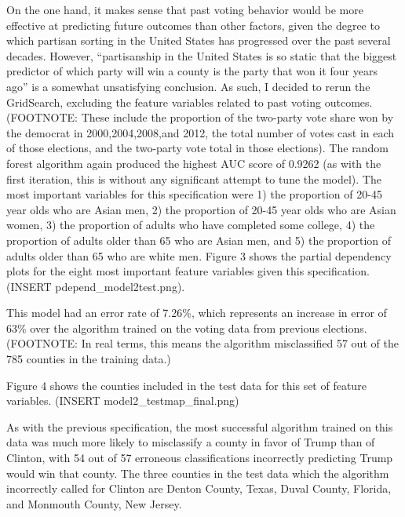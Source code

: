 \documentclass[11pt]{article}
\begin{document}
    On the one hand, it makes sense that past voting behavior would be more
effective at predicting future outcomes than other factors, given the
degree to which partisan sorting in the United States has progressed
over the past several decades. However, ``partisanship in the United
States is so static that the biggest predictor of which party will win a
county is the party that won it four years ago'' is a somewhat
unsatisfying conclusion. As such, I decided to rerun the GridSearch,
excluding the feature variables related to past voting outcomes.
(FOOTNOTE: These include the proportion of the two-party vote share won
by the democrat in 2000,2004,2008,and 2012, the total number of votes
cast in each of those elections, and the two-party vote total in those
elections). The random forest algorithm again produced the highest AUC
score of 0.9262 (as with the first iteration, this is without any
significant attempt to tune the model). The most important variables for
this specification were 1) the proportion of 20-45 year olds who are
Asian men, 2) the proportion of 20-45 year olds who are Asian women, 3)
the proportion of adults who have completed some college, 4) the
proportion of adults older than 65 who are Asian men, and 5) the
proportion of adults older than 65 who are white men. Figure 3 shows the
partial dependency plots for the eight most important feature variables
given this specification. (INSERT pdepend\_model2test.png).

This model had an error rate of 7.26\%, which represents an increase in
error of 63\% over the algorithm trained on the voting data from
previous elections. (FOOTNOTE: In real terms, this means the algorithm
misclassified 57 out of the 785 counties in the training data.)

Figure 4 shows the counties included in the test data for this set of
feature variables. (INSERT model2\_testmap\_final.png)

As with the previous specification, the most successful algorithm
trained on this data was much more likely to misclassify a county in
favor of Trump than of Clinton, with 54 out of 57 erroneous
classifications incorrectly predicting Trump would win that county. The
three counties in the test data which the algorithm incorrectly called
for Clinton are Denton County, Texas, Duval County, Florida, and
Monmouth County, New Jersey.
\end{document}
